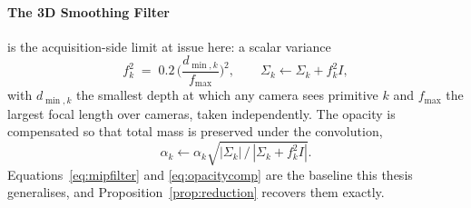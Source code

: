\paragraph{The 3D Smoothing Filter} is the acquisition-side limit at issue here:
a scalar variance
\begin{equation}
  f_k^2 \;=\; 0.2\,\Big(\frac{d_{\min,k}}{f_{\max}}\Big)^{\!2},
  \qquad \Sigma_k \leftarrow \Sigma_k + f_k^2 I,
  \label{eq:mipfilter}
\end{equation}
with $d_{\min,k}$ the smallest depth at which any camera sees primitive $k$ and
$f_{\max}$ the largest focal length over cameras, taken independently. The
opacity is compensated so that total mass is preserved under the convolution,
\begin{equation}
  \alpha_k \leftarrow \alpha_k\sqrt{|\Sigma_k| \,/\, |\Sigma_k + f_k^2 I|}.
  \label{eq:opacitycomp}
\end{equation}
Equations~\eqref{eq:mipfilter} and \eqref{eq:opacitycomp} are the baseline this
thesis generalises, and Proposition~\ref{prop:reduction} recovers them exactly.
